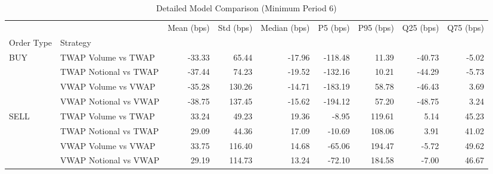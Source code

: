 \begin{table}
\caption{Detailed Model Comparison (Minimum Period 6)}
\label{tab:detailed_min_period_6}
\begin{tabular}{l|l|rrrrrrr}
\toprule
 &  & Mean (bps) & Std (bps) & Median (bps) & P5 (bps) & P95 (bps) & Q25 (bps) & Q75 (bps) \\
Order Type & Strategy &  &  &  &  &  &  &  \\
\midrule
\multirow[t]{4}{*}{BUY} & TWAP Volume vs TWAP & -33.33 & 65.44 & -17.96 & -118.48 & 11.39 & -40.73 & -5.02 \\
 & TWAP Notional vs TWAP & -37.44 & 74.23 & -19.52 & -132.16 & 10.21 & -44.29 & -5.73 \\
 & VWAP Volume vs VWAP & -35.28 & 130.26 & -14.71 & -183.19 & 58.78 & -46.43 & 3.69 \\
 & VWAP Notional vs VWAP & -38.75 & 137.45 & -15.62 & -194.12 & 57.20 & -48.75 & 3.24 \\
\cline{1-9}
\multirow[t]{4}{*}{SELL} & TWAP Volume vs TWAP & 33.24 & 49.23 & 19.36 & -8.95 & 119.61 & 5.14 & 45.23 \\
 & TWAP Notional vs TWAP & 29.09 & 44.36 & 17.09 & -10.69 & 108.06 & 3.91 & 41.02 \\
 & VWAP Volume vs VWAP & 33.75 & 116.40 & 14.68 & -65.06 & 194.47 & -5.72 & 49.62 \\
 & VWAP Notional vs VWAP & 29.19 & 114.73 & 13.24 & -72.10 & 184.58 & -7.00 & 46.67 \\
\cline{1-9}
\bottomrule
\end{tabular}
\end{table}
